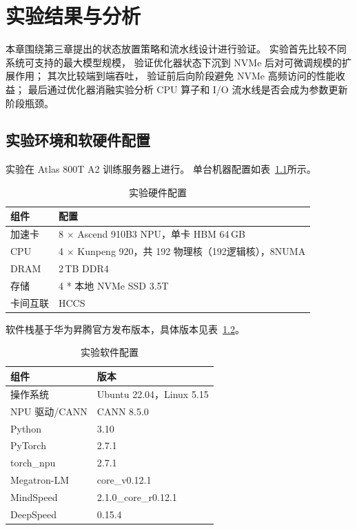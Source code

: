\documentclass[bachelor,openany,oneside,color,AutoFakeBold=true]{buaathesis}
\begin{document}
\chapter{实验结果与分析}
本章围绕第三章提出的状态放置策略和流水线设计进行验证。
实验首先比较不同系统可支持的最大模型规模，
验证优化器状态下沉到 NVMe 后对可微调规模的扩展作用；
其次比较端到端吞吐，
验证前后向阶段避免 NVMe 高频访问的性能收益；
最后通过优化器消融实验分析 CPU 算子和 I/O 流水线是否会成为参数更新阶段瓶颈。


\section{实验环境和软硬件配置}

实验在 Atlas 800T A2 训练服务器上进行。
单台机器配置如表~\ref{tab:hw}所示。

\begin{table}[!htbp]
  \centering
  \caption{实验硬件配置}
  \label{tab:hw}
  \begin{tabular}{ll}
    \toprule
    组件 & 配置 \\
    \midrule
    加速卡 & 8 $\times$ Ascend 910B3 NPU，单卡 HBM 64\,GB \\
    CPU    & 4 $\times$ Kunpeng 920，共 192 物理核（192逻辑核），8NUMA \\
    DRAM   & 2\,TB DDR4 \\
    存储   & 4 * 本地 NVMe SSD 3.5T \\
    卡间互联 & HCCS \\
    \bottomrule
  \end{tabular}
\end{table}

软件栈基于华为昇腾官方发布版本，具体版本见表~\ref{tab:sw}。

\begin{table}[!htbp]
  \centering
  \caption{实验软件配置}
  \label{tab:sw}
  \begin{tabular}{ll}
    \toprule
    组件 & 版本 \\
    \midrule
    操作系统         & Ubuntu 22.04，Linux 5.15 \\
    NPU 驱动/CANN    & CANN 8.5.0 \\
    Python           & 3.10 \\
    PyTorch          & 2.7.1 \\
    torch\_npu       & 2.7.1 \\
    Megatron-LM      & core\_v0.12.1 \\
    MindSpeed        & 2.1.0\_core\_r0.12.1 \\
    DeepSpeed        & 0.15.4 \\
    \bottomrule
  \end{tabular}
\end{table}
\end{document}
